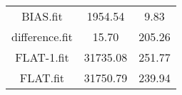 \begin{tabular}{ccc}
BIAS.fit & \num{1954.54} & \num{9.83}\\
difference.fit & \num{15.70} & \num{205.26}\\
FLAT-1.fit & \num{31735.08} & \num{251.77}\\
FLAT.fit & \num{31750.79} & \num{239.94}\\
\end{tabular}
